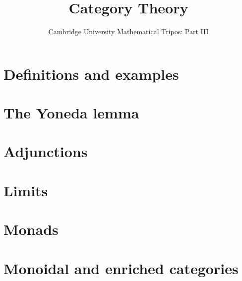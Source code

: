 \documentclass{article}
\title{Category Theory}
\author{Cambridge University Mathematical Tripos: Part III}
\begin{document}
\maketitle

\tableofcontentsnewpage{}

\section{Definitions and examples}

\section{The Yoneda lemma}

\section{Adjunctions}

\section{Limits}

\section{Monads}

\section{Monoidal and enriched categories}

\end{document}
